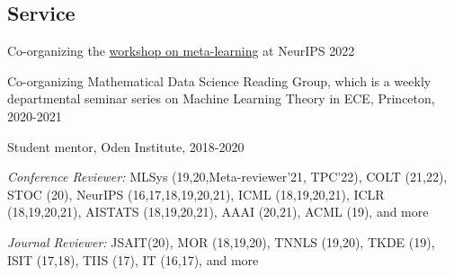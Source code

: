 \documentclass[margin, 10pt]{res} %
\begin{document}
\begin{resume}
\section{Service}
Co-organizing the \href{https://meta-learn.github.io/2022/}{workshop on meta-learning} at NeurIPS 2022

Co-organizing Mathematical Data Science Reading Group, which is a weekly departmental seminar series on Machine Learning Theory in ECE, Princeton, 2020-2021 

Student mentor,  Oden Institute, 2018-2020

{\sl Conference Reviewer:} MLSys (19,20,Meta-reviewer'21, TPC'22), COLT (21,22), STOC (20), NeurIPS (16,17,18,19,20,21), ICML (18,19,20,21), ICLR (18,19,20,21), 
AISTATS (18,19,20,21), AAAI (20,21), ACML (19), and more

{\sl Journal Reviewer:} JSAIT(20), MOR (18,19,20), TNNLS (19,20), TKDE (19), ISIT (17,18), TIIS (17), 
IT (16,17), and more


\begin{comment} 

 \section{Invited Talks}
 {``Label Propagation on Self-Supervised Representation Space."}
 	\begin{itemize}[noitemsep,topsep=0pt,parsep=0pt,partopsep=0pt]
	\item \href{https://simons.berkeley.edu/workshops/games2022-1}{Adversarial Approaches in Machine Learning Workshop}, Simons Institute, CA, 2022 
	\item \href{http://zke.fas.harvard.edu/HawaiiConference/Main.html}{New Advances in Statistics and Data Science}, Honolulu, Hawaii, 2022
\end{itemize}
 
{``Optimal Gradient-based Algorithms for Non-concave Bandit Optimization."}
 	\begin{itemize}[noitemsep,topsep=0pt,parsep=0pt,partopsep=0pt]
 		\item \href{http://bliss.eecs.berkeley.edu/Seminar/fa21/qi.html}{BLISS seminar}, UC Berkeley, virtual 2021
 		\item \href{https://simons.berkeley.edu/talks/optimal-gradient-based-algorithms-non-concave-bandit-optimization}{Sampling Algorithms and Geometries on Probability Distributions Workshop}, Simons Institute, CA, 2021 
 	\end{itemize}
 



\end{comment}
\end{resume}
\end{document}
